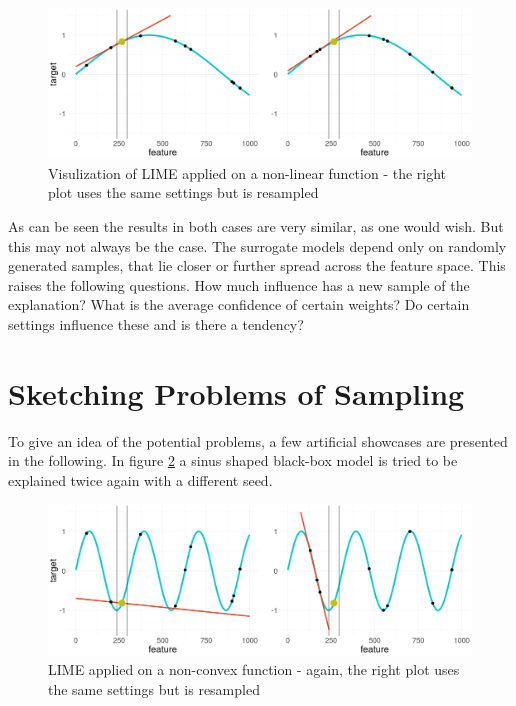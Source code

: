 \documentclass[]{krantz}
\begin{document}
\begin{figure}

{\centering \includegraphics[width=0.99\linewidth]{images/convex_samples_1vs2} 

}

\caption{Visulization of LIME applied on a non-linear function - the right plot uses the same settings but is resampled}\label{fig:figbasic}
\end{figure}

As can be seen the results in both cases are very similar, as one would
wish. But this may not always be the case. The surrogate models depend
only on randomly generated samples, that lie closer or further spread
across the feature space. This raises the following questions. How much
influence has a new sample of the explanation? What is the average
confidence of certain weights? Do certain settings influence these and
is there a tendency?

\section{Sketching Problems of
Sampling}\label{sketching-problems-of-sampling}

To give an idea of the potential problems, a few artificial showcases
are presented in the following. In figure \ref{fig:figbad} a sinus
shaped black-box model is tried to be explained twice again with a
different seed.

\begin{figure}

{\centering \includegraphics[width=0.99\linewidth]{images/nonconvex_samples_1vs2} 

}

\caption{LIME applied on a non-convex function - again, the right plot uses the same settings but is resampled}\label{fig:figbad}
\end{figure}
\end{document}
